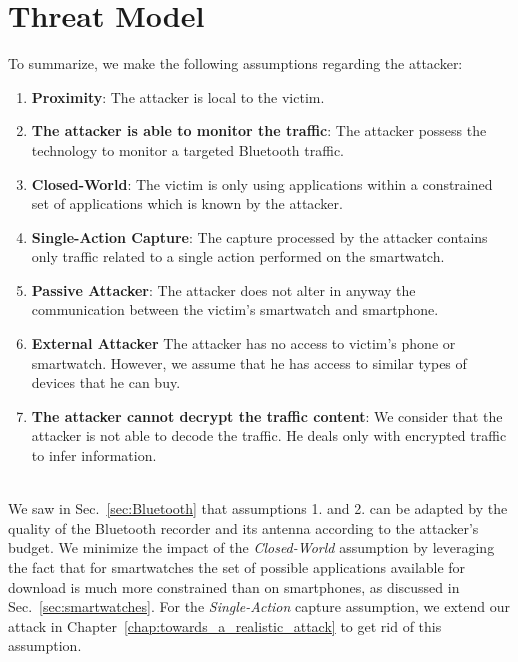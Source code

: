 \section{Threat Model} To summarize, we make the following assumptions regarding the attacker: 


\begin{enumerate}

    \item \textbf{Proximity}: The attacker is local to the victim.
    
    \item \textbf{The attacker is able to monitor the traffic}: The attacker possess the technology to monitor a targeted Bluetooth traffic.
    
    \item \textbf{Closed-World}: The victim is only using applications within a constrained set of applications which is known by the attacker.
    
    \item \textbf{Single-Action Capture}: The capture processed by the attacker contains only traffic related to a single action performed on the smartwatch.
    
    \item \textbf{Passive Attacker}: The attacker does not alter in anyway the communication between the victim's smartwatch and smartphone.
    
    \item \textbf{External Attacker} The attacker has no access to victim's phone or smartwatch. However, we assume that he has access to similar types of devices that he can buy.
    
    \item \textbf{The attacker cannot decrypt the traffic content}: We consider that the attacker is not able to decode the traffic. He deals only with encrypted traffic to infer information.
    
\end{enumerate}
\\
We saw in Sec.~\ref{sec:Bluetooth} that assumptions 1. and 2. can be adapted by the quality of the Bluetooth recorder and its antenna according to the attacker's budget. We minimize the impact of the \textit{Closed-World} assumption by leveraging the fact that for smartwatches the set of possible applications available for download is much more constrained than on smartphones, as discussed in Sec.~\ref{sec:smartwatches}. For the \textit{Single-Action} capture assumption, we extend our attack in Chapter~\ref{chap:towards_a_realistic_attack} to get rid of this assumption.
